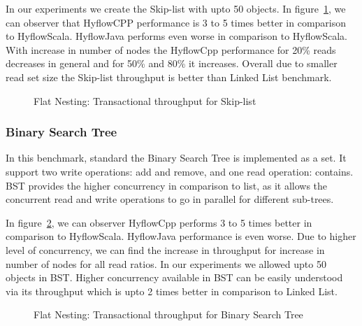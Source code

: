 \documentclass[12pt,english]{report}
\begin{document}
In our experiments we create the Skip-list with upto 50 objects. In figure~\ref{Fig:flatSkipList}, we can observer that HyflowCPP performance is 3 to 5 times better in comparison to HyflowScala. HyflowJava performs even worse in comparison to HyflowScala. With increase in number of nodes the HyflowCpp performance for 20\% reads decreases in general and for 50\% and 80\%  it increases. Overall due to smaller read set size the Skip-list throughput is better than Linked List benchmark. 

\begin{figure}[H]
\centering
{}
\end{figure}
\begin{figure}[H]
\centering
{}
\end{figure}
\begin{figure}[H]
\centering
{}
\caption{Flat Nesting: Transactional throughput for Skip-list}
\label{Fig:flatSkipList}
\end{figure}

\subsubsection{Binary Search Tree}
In this benchmark, standard the Binary Search Tree is implemented as a set. It support two write operations: add and remove, and one read operation: contains. BST provides the higher concurrency in comparison to list, as it allows the concurrent read and write operations to go in parallel for different sub-trees. 

In figure~\ref{Fig:flatBst}, we can observer HyflowCpp performs 3 to 5 times better in comparison to HyflowScala. HyflowJava performance is even worse. Due to higher level of concurrency, we can find the increase in throughput for increase in number of nodes for all read ratios. In our experiments we allowed upto 50 objects in BST. Higher concurrency available in BST can be easily understood via its throughput which  is upto 2 times better in comparison to Linked List.

\begin{figure}[H]
\centering
{}
\end{figure}
\begin{figure}[H]
\centering
{}
\end{figure}
\begin{figure}[H]
\centering
{}
\caption{Flat Nesting: Transactional throughput for Binary Search Tree}
\label{Fig:flatBst}
\end{figure}
\end{document}

